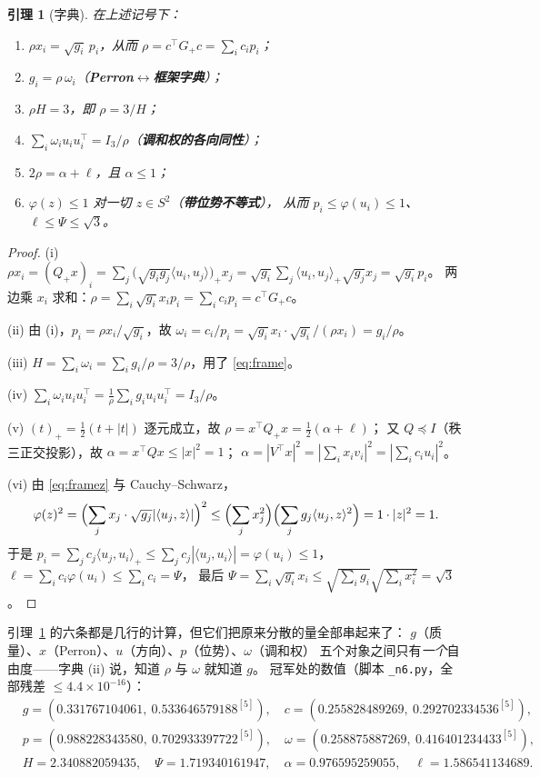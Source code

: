 \documentclass[UTF8,11pt]{ctexart}
\newtheorem{lemma}[theorem]{引理}
\theoremstyle{definition}
\begin{document}
\begin{lemma}[字典]\label{lem:dict}
在上述记号下：
\begin{enumerate}[label=(\roman*),leftmargin=2.2em]
\item $\rho x_i=\sqrt{g_i}\,p_i$，从而 $\rho=c^\top G_+c=\sum_ic_ip_i$；
\item $g_i=\rho\,\omega_i$（\textbf{Perron$\leftrightarrow$框架字典}）；
\item $\rho H=3$，即 $\rho=3/H$；
\item $\sum_i\omega_iu_iu_i^\top=I_3/\rho$（\textbf{调和权的各向同性}）；
\item $2\rho=\alpha+\ell$，且 $\alpha\le1$；
\item $\varphi(z)\le1$ 对一切 $z\in S^2$（\textbf{带位势不等式}），
从而 $p_i\le\varphi(u_i)\le1$、$\ell\le\Psi\le\sqrt3$。
\end{enumerate}
\end{lemma}

\begin{proof}
(i) $\rho x_i=(Q_+x)_i=\sum_j\bigl(\sqrt{g_ig_j}\langle u_i,u_j\rangle\bigr)_+x_j
=\sqrt{g_i}\sum_j\langle u_i,u_j\rangle_+\sqrt{g_j}x_j=\sqrt{g_i}p_i$。
两边乘 $x_i$ 求和：$\rho=\sum_i\sqrt{g_i}x_ip_i=\sum_ic_ip_i=c^\top G_+c$。

(ii) 由 (i)，$p_i=\rho x_i/\sqrt{g_i}$，故 $\omega_i=c_i/p_i=\sqrt{g_i}x_i\cdot\sqrt{g_i}/(\rho x_i)=g_i/\rho$。

(iii) $H=\sum_i\omega_i=\sum_ig_i/\rho=3/\rho$，用了 \eqref{eq:frame}。

(iv) $\sum_i\omega_iu_iu_i^\top=\frac1\rho\sum_ig_iu_iu_i^\top=I_3/\rho$。

(v) $(t)_+=\frac12(t+|t|)$ 逐元成立，故 $\rho=x^\top Q_+x=\frac12(\alpha+\ell)$；
又 $Q\preceq I$（秩三正交投影），故 $\alpha=x^\top Qx\le|x|^2=1$；
$\alpha=|V^\top x|^2=|\sum_ix_iv_i|^2=|\sum_ic_iu_i|^2$。

(vi) 由 \eqref{eq:framez} 与 Cauchy--Schwarz，
\[
\varphi(z)^2=\Bigl(\sum_jx_j\cdot\sqrt{g_j}|\langle u_j,z\rangle|\Bigr)^2
\le\Bigl(\sum_jx_j^2\Bigr)\Bigl(\sum_jg_j\langle u_j,z\rangle^2\Bigr)=1\cdot|z|^2=1 .
\]
于是 $p_i=\sum_jc_j\langle u_j,u_i\rangle_+\le\sum_jc_j|\langle u_j,u_i\rangle|=\varphi(u_i)\le1$，
$\ell=\sum_ic_i\varphi(u_i)\le\sum_ic_i=\Psi$，
最后 $\Psi=\sum_i\sqrt{g_i}x_i\le\sqrt{\sum_ig_i}\sqrt{\sum_ix_i^2}=\sqrt3$。
\end{proof}

引理~\ref{lem:dict} 的六条都是几行的计算，但它们把原来分散的量全部串起来了：
$g$（质量）、$x$（Perron）、$u$（方向）、$p$（位势）、$\omega$（调和权）
五个对象之间只有\emph{一个}自由度——字典 (ii) 说，知道 $\rho$ 与 $\omega$ 就知道 $g$。
冠军处的数值（脚本 \texttt{\_n6.py}，全部残差 $\le4.4\times10^{-16}$）：
\[
\begin{aligned}
&g=(0.331767104061,\ 0.533646579188^{[5]}),\quad
c=(0.255828489269,\ 0.292702334536^{[5]}),\\
&p=(0.988228343580,\ 0.702933397722^{[5]}),\quad
\omega=(0.258875887269,\ 0.416401234433^{[5]}),\\
&H=2.340882059435,\quad \Psi=1.719340161947,\quad
\alpha=0.976595259055,\quad \ell=1.586541134689 .
\end{aligned}
\]
\end{document}
